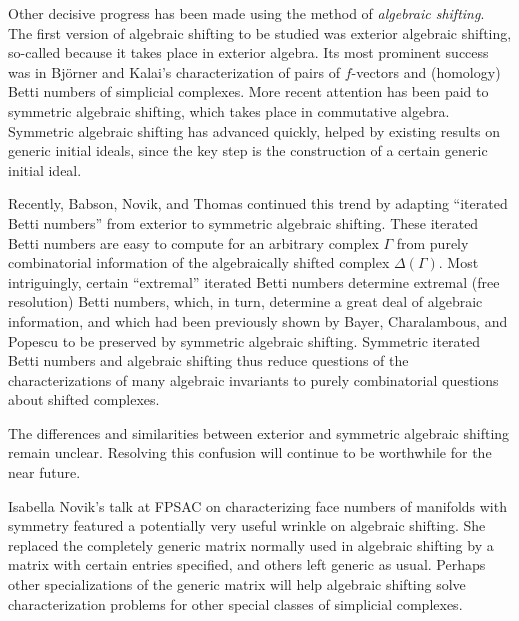 \documentclass{amsart}
\begin{document}
Other decisive progress has been made using the method of 
{\em algebraic shifting}.
The first version of algebraic shifting to be studied was exterior
algebraic shifting, so-called because it takes place in exterior algebra.
Its most prominent success was in Bj\"orner and Kalai's characterization of
pairs of $f$-vectors and (homology) Betti numbers of simplicial complexes.
More recent attention has been paid to symmetric algebraic shifting, which
takes place in commutative algebra.  Symmetric algebraic shifting has
advanced quickly, helped by existing results on generic initial ideals,
since the key step is the construction of a certain generic initial ideal.

Recently, Babson, Novik, and Thomas continued this trend by adapting
``iterated Betti numbers'' from exterior to symmetric algebraic
shifting.  These iterated Betti numbers are easy to compute for an
arbitrary complex $\Gamma$ from purely combinatorial information of
the algebraically shifted complex $\Delta(\Gamma)$.  Most
intriguingly, certain ``extremal'' iterated Betti numbers determine
extremal (free resolution) Betti numbers, which, in turn, determine a
great deal of algebraic information, and which had been previously
shown by Bayer, Charalambous, and Popescu to be preserved by symmetric
algebraic shifting.  Symmetric iterated Betti numbers and algebraic
shifting thus reduce questions of the characterizations of many
algebraic invariants to purely combinatorial questions about shifted
complexes.

The differences and similarities between exterior and symmetric algebraic
shifting remain unclear.  Resolving this confusion will continue to be
worthwhile for the near future.

Isabella Novik's talk at FPSAC on characterizing face numbers of manifolds
with symmetry featured a potentially very useful wrinkle on algebraic
shifting.  She replaced the completely generic matrix normally used in
algebraic shifting by a matrix with certain entries specified, and others
left generic as usual.  Perhaps other specializations of the generic
matrix will help algebraic shifting solve characterization problems for
other special classes of simplicial complexes.
\end{document}
